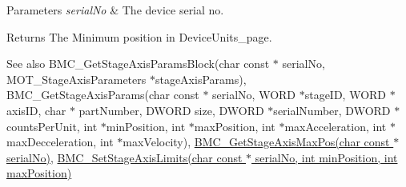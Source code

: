 \begin{DoxyParams}{Parameters}
{\em serial\+No} & The device serial no. \\
\hline
\end{DoxyParams}
\begin{DoxyReturn}{Returns}
The Minimum position in Device\+Units\+\_\+page. 
\end{DoxyReturn}
\begin{DoxySeeAlso}{See also}
B\+M\+C\+\_\+\+Get\+Stage\+Axis\+Params\+Block(char const $\ast$ serial\+No, M\+O\+T\+\_\+\+Stage\+Axis\+Parameters $\ast$stage\+Axis\+Params), B\+M\+C\+\_\+\+Get\+Stage\+Axis\+Params(char const $\ast$ serial\+No, W\+O\+R\+D $\ast$stage\+I\+D, W\+O\+R\+D $\ast$axis\+I\+D, char $\ast$ part\+Number, D\+W\+O\+R\+D size, D\+W\+O\+R\+D $\ast$serial\+Number, D\+W\+O\+R\+D $\ast$counts\+Per\+Unit, int $\ast$min\+Position, int $\ast$max\+Position, int $\ast$max\+Acceleration, int $\ast$max\+Decceleration, int $\ast$max\+Velocity), \hyperlink{group___k_cube_brushless_motor_ga19bb9bd09339a3489c09538ea7c80dd4}{B\+M\+C\+\_\+\+Get\+Stage\+Axis\+Max\+Pos(char const $\ast$ serial\+No)}, \hyperlink{group___k_cube_brushless_motor_ga0c08eca51103edd266a7258007d6944b}{B\+M\+C\+\_\+\+Set\+Stage\+Axis\+Limits(char const $\ast$ serial\+No, int min\+Position, int max\+Position)}


\end{DoxySeeAlso}
